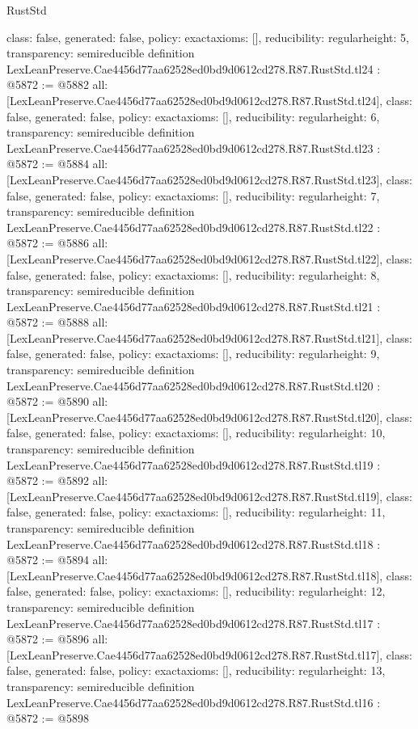 \begin{lexlean}{RustStd}
\begin{coremodule}
{  class: false,
  generated: false,
  policy: exact{axioms: []},
  reducibility: regular{height: 5},
  transparency: semireducible
}
definition LexLeanPreserve.Cae4456d77aa62528ed0bd9d0612cd278.R87.RustStd.tl24 : @5872 := @5882 {
  all: [LexLeanPreserve.Cae4456d77aa62528ed0bd9d0612cd278.R87.RustStd.tl24],
  class: false,
  generated: false,
  policy: exact{axioms: []},
  reducibility: regular{height: 6},
  transparency: semireducible
}
definition LexLeanPreserve.Cae4456d77aa62528ed0bd9d0612cd278.R87.RustStd.tl23 : @5872 := @5884 {
  all: [LexLeanPreserve.Cae4456d77aa62528ed0bd9d0612cd278.R87.RustStd.tl23],
  class: false,
  generated: false,
  policy: exact{axioms: []},
  reducibility: regular{height: 7},
  transparency: semireducible
}
definition LexLeanPreserve.Cae4456d77aa62528ed0bd9d0612cd278.R87.RustStd.tl22 : @5872 := @5886 {
  all: [LexLeanPreserve.Cae4456d77aa62528ed0bd9d0612cd278.R87.RustStd.tl22],
  class: false,
  generated: false,
  policy: exact{axioms: []},
  reducibility: regular{height: 8},
  transparency: semireducible
}
definition LexLeanPreserve.Cae4456d77aa62528ed0bd9d0612cd278.R87.RustStd.tl21 : @5872 := @5888 {
  all: [LexLeanPreserve.Cae4456d77aa62528ed0bd9d0612cd278.R87.RustStd.tl21],
  class: false,
  generated: false,
  policy: exact{axioms: []},
  reducibility: regular{height: 9},
  transparency: semireducible
}
definition LexLeanPreserve.Cae4456d77aa62528ed0bd9d0612cd278.R87.RustStd.tl20 : @5872 := @5890 {
  all: [LexLeanPreserve.Cae4456d77aa62528ed0bd9d0612cd278.R87.RustStd.tl20],
  class: false,
  generated: false,
  policy: exact{axioms: []},
  reducibility: regular{height: 10},
  transparency: semireducible
}
definition LexLeanPreserve.Cae4456d77aa62528ed0bd9d0612cd278.R87.RustStd.tl19 : @5872 := @5892 {
  all: [LexLeanPreserve.Cae4456d77aa62528ed0bd9d0612cd278.R87.RustStd.tl19],
  class: false,
  generated: false,
  policy: exact{axioms: []},
  reducibility: regular{height: 11},
  transparency: semireducible
}
definition LexLeanPreserve.Cae4456d77aa62528ed0bd9d0612cd278.R87.RustStd.tl18 : @5872 := @5894 {
  all: [LexLeanPreserve.Cae4456d77aa62528ed0bd9d0612cd278.R87.RustStd.tl18],
  class: false,
  generated: false,
  policy: exact{axioms: []},
  reducibility: regular{height: 12},
  transparency: semireducible
}
definition LexLeanPreserve.Cae4456d77aa62528ed0bd9d0612cd278.R87.RustStd.tl17 : @5872 := @5896 {
  all: [LexLeanPreserve.Cae4456d77aa62528ed0bd9d0612cd278.R87.RustStd.tl17],
  class: false,
  generated: false,
  policy: exact{axioms: []},
  reducibility: regular{height: 13},
  transparency: semireducible
}
definition LexLeanPreserve.Cae4456d77aa62528ed0bd9d0612cd278.R87.RustStd.tl16 : @5872 := @5898 {
}
\end{coremodule}
\end{lexlean}
